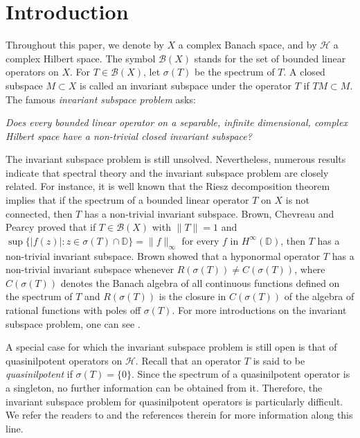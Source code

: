 \documentclass[12pt]{amsart}
\numberwithin{equation}{section}
\theoremstyle{plain}
\theoremstyle{definition}
\newcommand{\B}{{\mathcal{B}}}
\renewcommand{\H}{{\mathcal{H}}}
\begin{document}

\section{Introduction}

Throughout this paper, we denote by $X$ a complex Banach space, and by $\H$ a complex Hilbert space.
The symbol $\B(X)$ stands for the set of bounded linear operators on $X$.
For $T\in \mathcal{B}(X)$, let $\sigma(T)$ be the spectrum of $T$.
A closed subspace $M\subset X$ is called an invariant subspace under the operator $T$ if $TM\subset M$.
The famous \emph{invariant subspace problem} asks:

{\em Does every bounded linear operator on a separable, infinite dimensional, complex Hilbert space have a non-trivial closed invariant subspace?}

The invariant subspace problem is still unsolved.
Nevertheless,
numerous results indicate that spectral theory and the invariant subspace problem are closely related.
For instance, it is well known that the Riesz decomposition theorem implies that if the spectrum of a bounded linear operator $T$ on $X$ is not connected, then $T$ has a non-trivial invariant subspace.
Brown, Chevreau and Pearcy \cite{BCP1979} proved that if $T\in\B(X)$ with $\|T\|=1$ and $\sup\{|f(z)|:z\in\sigma(T)\cap \mathbb{D}\}=\|f\|_{\infty}$ for every $f$ in $H^{\infty}(\mathbb{D})$,
then $T$ has a non-trivial invariant subspace.
Brown \cite{Brown1987} showed that a hyponormal operator $T$ has a non-trivial invariant subspace whenever $R(\sigma(T))\neq C(\sigma(T))$, where $C(\sigma(T))$ denotes the Banach algebra of all continuous functions defined on the spectrum of $T$ and $R(\sigma(T))$ is the closure in $C(\sigma(T))$ of the algebra of rational functions with poles off $\sigma(T)$.
For more introductions on the invariant subspace problem, one can see \cite{CP2011,RR03,Sar74}.

A special case for which the invariant subspace problem is
still open is that of quasinilpotent operators on $\H$.
Recall that an operator $T$ is said to be {\em quasinilpotent} if $\sigma(T)=\{0\}$.
Since the spectrum of a quasinilpotent operator is a singleton, no further information can be obtained from it.
Therefore, the invariant subspace problem for quasinilpotent operators is particularly difficult.
We refer the readers to \cite{FJKP04,FJKP05,FP05,Read97,Tcaciuc2019} and the references therein for more information along this line.
\end{document}
